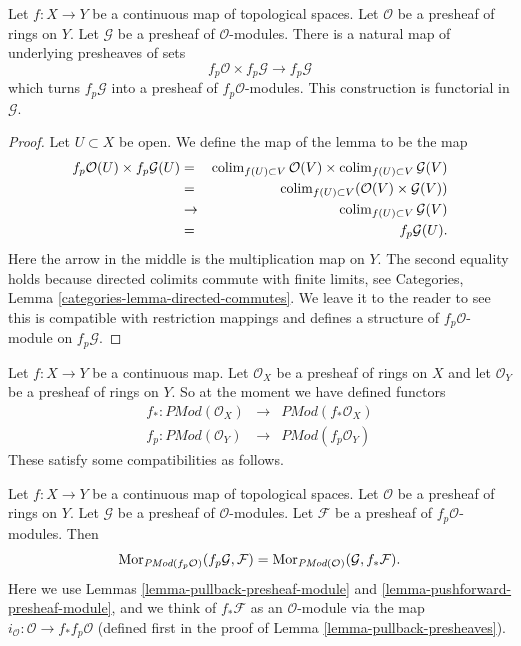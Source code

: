 \begin{lemma}
\label{lemma-pullback-presheaf-module}
Let $f : X \to Y$ be a continuous map of topological spaces.
Let $\mathcal{O}$ be a presheaf of rings on $Y$. Let
$\mathcal{G}$ be a presheaf of $\mathcal{O}$-modules.
There is a natural map of underlying presheaves of sets
$$
f_p\mathcal{O} \times f_p\mathcal{G}
\longrightarrow
f_p\mathcal{G}
$$
which turns $f_p\mathcal{G}$ into a presheaf of $f_p\mathcal{O}$-modules.
This construction is functorial in $\mathcal{G}$.
\end{lemma}

\begin{proof}
Let $U \subset X$ be open. We define the map of the lemma
to be the map
\begin{eqnarray*}
f_p\mathcal{O}(U) \times f_p\mathcal{G}(U)
& = &
\mathop{\mathrm{colim}}\nolimits_{f(U) \subset V} \mathcal{O}(V)
\times
\mathop{\mathrm{colim}}\nolimits_{f(U) \subset V} \mathcal{G}(V) \\
& = &
\mathop{\mathrm{colim}}\nolimits_{f(U) \subset V} (\mathcal{O}(V)\times \mathcal{G}(V)) \\
& \to &
\mathop{\mathrm{colim}}\nolimits_{f(U) \subset V} \mathcal{G}(V) \\
& = &
f_p\mathcal{G}(U).
\end{eqnarray*}
Here the arrow in the middle is the multiplication map on $Y$.
The second equality holds because directed colimits commute
with finite limits, see
Categories, Lemma \ref{categories-lemma-directed-commutes}.
We leave it to the reader to see this is compatible with
restriction mappings and defines a structure of
$f_p\mathcal{O}$-module on $f_p\mathcal{G}$.
\end{proof}

\noindent
Let $f : X \to Y$ be a continuous map.
Let $\mathcal{O}_X$ be a presheaf of rings on $X$ and
let $\mathcal{O}_Y$ be a presheaf of rings on $Y$.
So at the moment we have defined functors
\begin{eqnarray*}
f_* : \textit{PMod}(\mathcal{O}_X) &
\longrightarrow &
\textit{PMod}(f_*\mathcal{O}_X) \\
f_p : \textit{PMod}(\mathcal{O}_Y) &
\longrightarrow &
\textit{PMod}(f_p\mathcal{O}_Y)
\end{eqnarray*}
These satisfy some compatibilities as follows.

\begin{lemma}
\label{lemma-adjoint-push-pull-presheaves-modules}
Let $f : X \to Y$ be a continuous map of topological spaces.
Let $\mathcal{O}$ be a presheaf of rings on $Y$.
Let $\mathcal{G}$ be a presheaf of $\mathcal{O}$-modules.
Let $\mathcal{F}$ be a presheaf of $f_p\mathcal{O}$-modules.
Then
$$
\mathop{\mathrm{Mor}}\nolimits_{\textit{PMod}(f_p\mathcal{O})}(f_p\mathcal{G}, \mathcal{F})
=
\mathop{\mathrm{Mor}}\nolimits_{\textit{PMod}(\mathcal{O})}(\mathcal{G}, f_*\mathcal{F}).
$$
Here we use
Lemmas \ref{lemma-pullback-presheaf-module}
and \ref{lemma-pushforward-presheaf-module}, and we think of
$f_*\mathcal{F}$ as an $\mathcal{O}$-module via the map
$i_\mathcal{O} : \mathcal{O} \to f_*f_p\mathcal{O}$
(defined first in the proof of Lemma \ref{lemma-pullback-presheaves}).
\end{lemma}

